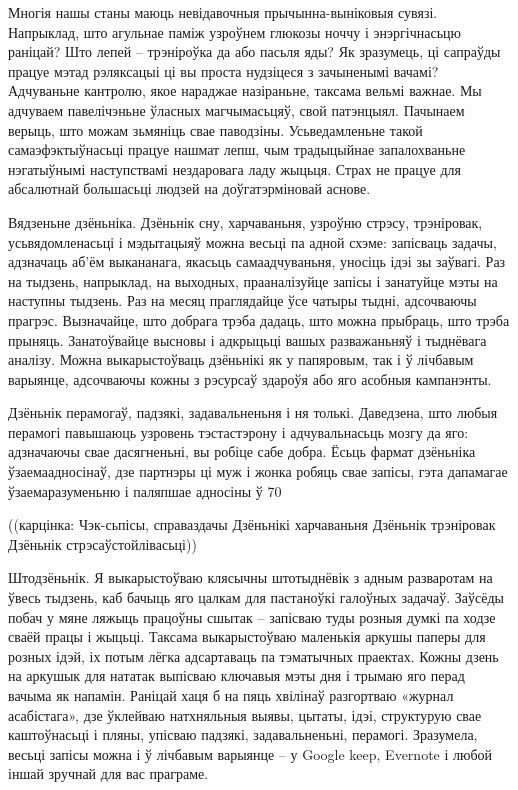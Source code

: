 Многія нашы станы маюць невідавочныя прычынна-выніковыя сувязі. Напрыклад, што агульнае паміж узроўнем глюкозы ноччу і энэргічнасьцю раніцай? Што лепей – трэніроўка да або пасьля яды? Як зразумець, ці сапраўды працуе мэтад рэляксацыі ці вы проста нудзіцеся з зачыненымі вачамі? Адчуваньне кантролю, якое нараджае назіраньне, таксама вельмі важнае. Мы адчуваем павелічэньне ўласных магчымасьцяў, свой патэнцыял. Пачынаем верыць, што можам зьмяніць свае паводзіны. Усьведамленьне такой самаэфэктыўнасьці працуе нашмат лепш, чым традыцыйнае запалохваньне нэгатыўнымі наступствамі нездаровага ладу жыцьця. Страх не працуе для абсалютнай большасьці людзей на доўгатэрміновай аснове.

Вядзеньне дзёньніка. Дзёньнік сну, харчаваньня, узроўню стрэсу, трэніровак, усьвядомленасьці і мэдытацыяў можна весьці па адной схэме: запісваць задачы, адзначаць аб'ём выкананага, якасьць самаадчуваньня, уносіць ідэі зы заўвагі. Раз на тыдзень, напрыклад, на выходных, прааналізуйце запісы і занатуйце мэты на наступны тыдзень. Раз на месяц праглядайце ўсе чатыры тыдні, адсочваючы прагрэс. Вызначайце, што добрага трэба дадаць, што можна прыбраць, што трэба прыняць. Занатоўвайце высновы і адкрыцьці вашых разважаньняў і тыднёвага аналізу. Можна выкарыстоўваць дзёньнікі як у папяровым, так і ў лічбавым варыянце, адсочваючы кожны з рэсурсаў здароўя або яго асобныя кампанэнты.

Дзёньнік перамогаў, падзякі, задавальненьня і ня толькі. Даведзена, што любыя перамогі павышаюць узровень тэстастэрону і адчувальнасьць мозгу да яго: адзначаючы свае дасягненьні, вы робіце сабе добра. Ёсьць фармат дзёньніка ўзаемаадносінаў, дзе партнэры ці муж і жонка робяць свае запісы, гэта дапамагае ўзаемаразуменьню і паляпшае адносіны ў 70%

((карцінка: Чэк-сьпісы, справаздачы Дзёньнікі харчаваньня Дзёньнік трэніровак Дзёньнік стрэсаўстойлівасьці))

Штодзёньнік. Я выкарыстоўваю клясычны штотыднёвік з адным разваротам на ўвесь тыдзень, каб бачыць яго цалкам для пастаноўкі галоўных задачаў. Заўсёды побач у мяне ляжыць працоўны сшытак – запісваю туды розныя думкі па ходзе сваёй працы і жыцьці. Таксама выкарыстоўваю маленькія аркушы паперы для розных ідэй, іх потым лёгка адсартаваць па тэматычных праектах. Кожны дзень на аркушык для нататак выпісваю ключавыя мэты дня і трымаю яго перад вачыма як напамін. Раніцай хаця б на пяць хвілінаў разгортваю «журнал асабістага», дзе ўклейваю натхняльныя выявы, цытаты, ідэі, структурую свае каштоўнасьці і пляны, упісваю падзякі, задавальненьні, перамогі. Зразумела, весьці запісы можна і ў лічбавым варыянце – у Google keep, Evernote і любой іншай зручнай для вас праграме.

